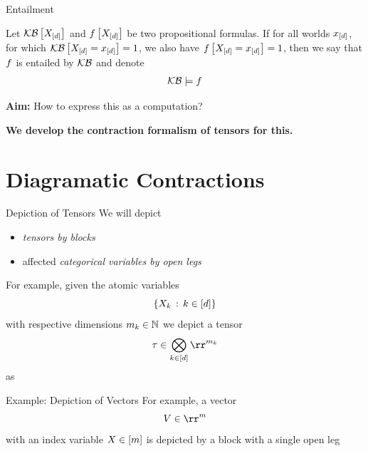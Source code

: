 \documentclass{beamer}
\begin{document}
    \begin{frame}{Entailment}
        
        \begin{definition}[Entailment]
            Let $\mathcal{KB}\left[X_{[d]}\right]$ and $f\left[X_{[d]}\right]$ be two propositional formulas.
            If for all worlds $x_{[d]}$, for which $\mathcal{KB}\left[X_{[d]}=x_{[d]}\right]=1$, we also have $f\left[X_{[d]}=x_{[d]}\right]=1$, then we say that $f$ is entailed by $\mathcal{KB}$ and denote
            \begin{align*}
                \mathcal{KB} \models f
            \end{align*}

        \end{definition}

        \textbf{Aim:} How to express this as a computation?

        \begin{center}
            \bf We develop the contraction formalism of tensors for this.
        \end{center}

    \end{frame}




    \section{Diagramatic Contractions}

    \begin{frame}{Depiction of Tensors}
        We will depict
        \begin{itemize}
            \item \emph{tensors by blocks}
            \item affected \emph{categorical variables by open legs}
        \end{itemize}
        For example, given the atomic variables
        \[ \{X_{k} \, : \, k\in[d] \} \]
        with respective dimensions $m_{k}\in\mathbb{N}$ we depict a tensor
        \[ \hypercore \in \bigotimes_{\atomenumeratorin} \rr^{\catdimof{\atomenumerator}} \]
        as
        \begin{center}
            
        \end{center}
    \end{frame}


    \begin{frame}{Example: Depiction of Vectors}
        For example, a vector
        \[ V \in \rr^{m}\]
        with an index variable $X\in[m]$ is depicted by a block with a single open leg
        \begin{center}
            
        \end{center}
    \end{frame}
\end{document}
